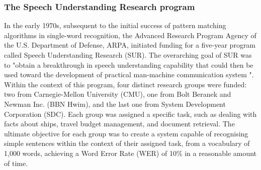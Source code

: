  

\subsubsection{The Speech Understanding Research program}


In the early 1970s, subsequent to the initial success of pattern matching algorithms in single-word recognition, the Advanced Research Program Agency of the U.S. Department of Defense, ARPA, initiated funding for a five-year program called Speech Understanding Research (SUR). The overarching goal of SUR was to "obtain a breakthrough in speech understanding capability that could then be used toward the development of practical man-machine communication system ". Within the context of this program, four distinct research groups were funded: two from Carnegie-Mellon University (CMU), one from Bolt Beranek and Newman Inc. (BBN Hwim), and the last one from System Development Corporation (SDC). Each group was assigned a specific task, such as dealing with facts about ships, travel budget management, and document retrieval. The ultimate objective for each group was to create a system capable of recognising simple sentences within the context of their assigned task, from a vocabulary of 1,000 words, achieving a Word Error Rate (WER) of 10\% in a reasonable amount of time.


